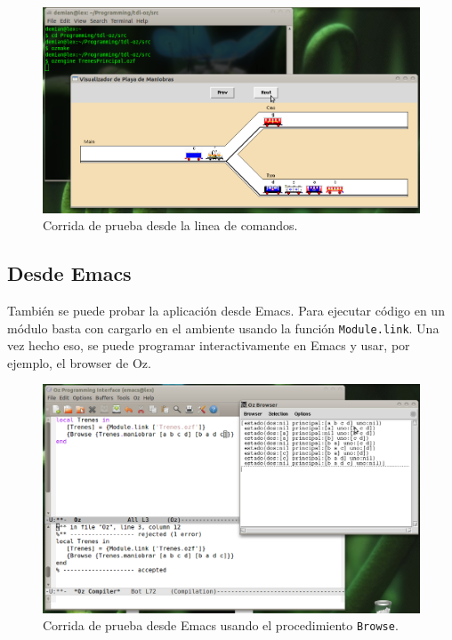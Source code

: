 \documentclass[12pt,titlepage]{article}
\begin{document}
\begin{figure}[H]
\begin{center}
\includegraphics[width=17cm]{corrida-consola}
\caption{Corrida de prueba desde la linea de comandos.}
\end{center}
\end{figure}

\subsection{Desde Emacs}

También se puede probar la aplicación desde Emacs. Para ejecutar código en un módulo basta con cargarlo en el ambiente usando la función \lstinline|Module.link|. Una vez hecho eso, se puede programar interactivamente en Emacs y usar, por ejemplo, el browser de Oz.

\begin{figure}[H]
\begin{center}
\includegraphics[width=17cm]{corrida-emacs}
\caption{Corrida de prueba desde Emacs usando el procedimiento \lstinline|Browse|.}
\end{center}
\end{figure}

\end{document}
